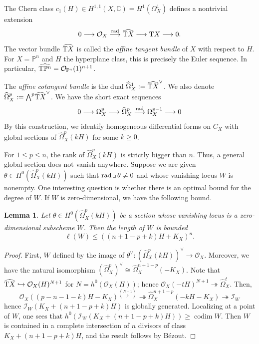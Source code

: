\documentclass[a4paper, 11pt]{amsart}
\newcommand{\CC}{\mathbb{C}}
\newcommand{\extp}{{\textstyle \bigwedge}}
\theoremstyle{plain}
\numberwithin{theorem}{section}
\newtheorem{lemma}[theorem]{Lemma}
\theoremstyle{definition}
\DeclareMathOperator{\codim}{{codim}}
\DeclareMathOperator{\cont}{\lrcorner}
\newcommand{\onto}{\twoheadrightarrow}
\newcommand{\OX}{\mathcal{O}_X}
\newcommand{\lra}{\longrightarrow}
\newcommand{\opn}{{\mathcal O}_{\mathbb{P}^{n}}}
\newcommand{\pn}{{\mathbb{P}^{n}}}
\newcommand{\tpn}{{\rm T}{\mathbb{P}^{n}}}
\newcommand{\sI}{\mathscr{I}}
\newcommand{\tX}{{\rm T}X}
\newcommand{\rad}{ {\rm rad}}
\begin{document}
The Chern class $c_1(H) \in H^{1,1}(X,\CC) = H^1(\Omega_X^1)$ defines a nontrivial extension 
\[
0 \lra \OX  \stackrel{\rad}{\lra} \widehat{\tX} \lra \tX \lra 0 .
\]
The vector bundle $\widehat{\tX}$ is called the \emph{affine tangent bundle} of $X$ with respect to $H$. For $X = \pn$ and $H$ the hyperplane class, this is precisely the Euler sequence. In particular, $\widehat{\tpn} = \opn(1)^{n+1}$. 

The \emph{affine cotangent bundle} is the dual $\widehat{\Omega}_X^1 :=  \widehat{\tX}^\vee$. We also denote $\widehat{\Omega}_X^p := \extp^p \widehat{\tX}^\vee$. We have the short exact sequences
\[
0 \lra \Omega_X^{p} \lra \widehat{\Omega}_X^p \stackrel{\rad}{\lra} \Omega_X^{p-1} \lra 0 
\]
By this construction, we identify homogeneous differential forms on $C_X$ with global sections of $\widehat{\Omega}_X^p(kH)$ for some $k\geq 0$.

For $1 \leq p \leq n$, the rank of $\widehat{\Omega}_X^p(kH)$ is strictly bigger than $n$. Thus, a general global section does not vanish anywhere. Suppose we are given $\theta \in H^0(\widehat{\Omega}_X^p(kH))$ such that $\rad\cont \theta \neq 0$ and whose vanishing locus $W$ is nonempty. One interesting question is whether there is an optimal bound for the degree of $W$. If $W$ is zero-dimensional, we have the following bound. 

\begin{lemma}\label{lem:bound-domega}
Let $\theta \in H^0(\widehat{\Omega}_X^p(kH))$ be a section whose vanishing locus is a zero-dimensional subscheme $W$. Then the length of $W$ is bounded
\[
\ell(W) \leq ((n+1-p+k)H+K_X)^n.
\]
\end{lemma}

\begin{proof}
First, $W$ defined by the image of $\theta^\vee \colon (\widehat{\Omega}_X^p(kH))^\vee \to \OX$. Moreover, we have the natural isomorphism $(\widehat{\Omega}_X^p)^\vee \cong \widehat{\Omega}_X^{n+1-p}(-K_X)$. Note that $\widehat{\tX} \hookrightarrow \OX(H)^{N+1}$ for $N = h^0(\OX(H))$; hence $\OX(-tH)^{N+1} \onto \widehat{\Omega}_X^t$. Then, 
\[
\OX((p-n-1-k)H-K_X)^{\binom{N+1}{p}} \onto \widehat{\Omega}_X^{n+1-p}(-kH-K_X ) \onto \sI_W 
\]
hence $\sI_W(K_X + (n+1-p+k)H)$ is globally generated. Localizing at a point of $W$, one sees that $h^0(\sI_W(K_X + (n+1-p+k)H))\geq \codim W$. Then $W$ is contained in a complete intersection of $n$ divisors of class $K_X + (n+1-p+k)H$, and the result follows by Bézout. 
\end{proof}
\end{document}
